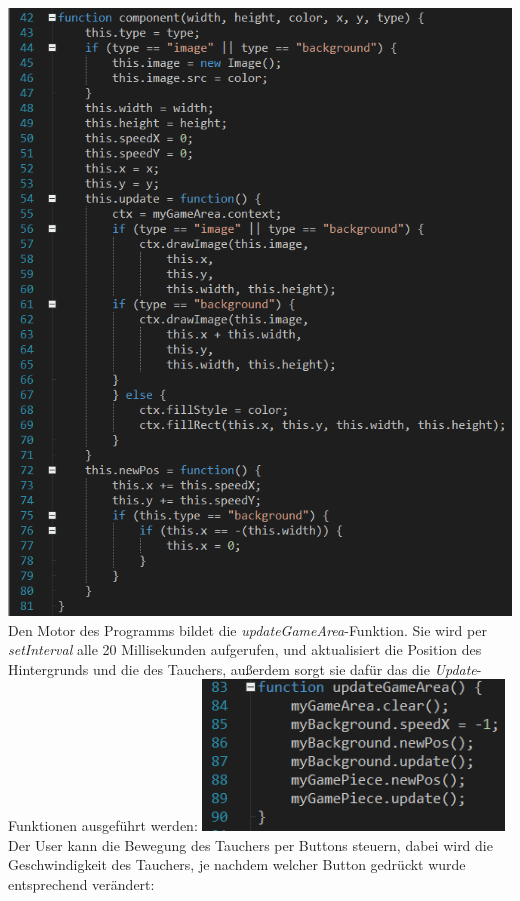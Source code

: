 \includegraphics[width=1\textwidth]{img/vincent/abb06.png}
\newline
Den Motor des Programms bildet die \textit{updateGameArea}-Funktion. Sie wird per \textit{setInterval} alle 20 Millisekunden aufgerufen, und aktualisiert die Position des Hintergrunds und die des Tauchers, außerdem sorgt sie daf\"ur das die \textit{Update}-Funktionen ausgef\"uhrt werden:
\newline
\includegraphics[width=0.6\textwidth]{img/vincent/abb07.png}
\newline
Der User kann die Bewegung des Tauchers per Buttons steuern, dabei wird die Geschwindigkeit des Tauchers, je nachdem welcher Button gedr\"uckt wurde entsprechend ver\"andert:
